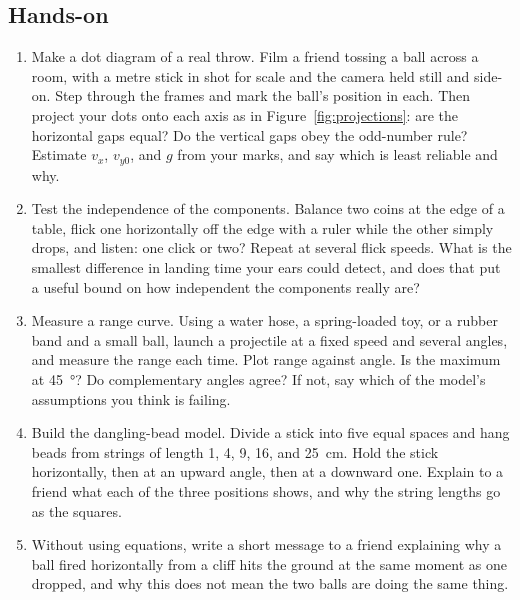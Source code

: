 \documentclass[11pt,twoside,openany]{book}
\begin{document}
\subsection*{Hands-on}
\begin{enumerate}[label=\textbf{\thechapter.\arabic*},resume=exercises,leftmargin=*]
  \item Make a dot diagram of a real throw. Film a friend tossing a ball across a room, with a metre stick in shot for scale and the camera held still and side-on. Step through the frames and mark the ball's position in each. Then project your dots onto each axis as in Figure~\ref{fig:projections}: are the horizontal gaps equal? Do the vertical gaps obey the odd-number rule? Estimate $v_x$, $v_{y0}$, and $g$ from your marks, and say which is least reliable and why.
  \item Test the independence of the components. Balance two coins at the edge of a table, flick one horizontally off the edge with a ruler while the other simply drops, and listen: one click or two? Repeat at several flick speeds. What is the smallest difference in landing time your ears could detect, and does that put a useful bound on how independent the components really are?
  \item Measure a range curve. Using a water hose, a spring-loaded toy, or a rubber band and a small ball, launch a projectile at a fixed speed and several angles, and measure the range each time. Plot range against angle. Is the maximum at \SI{45}{\degree}? Do complementary angles agree? If not, say which of the model's assumptions you think is failing.
  \item Build the dangling-bead model. Divide a stick into five equal spaces and hang beads from strings of length \SI{1}{}, \SI{4}{}, \SI{9}{}, \SI{16}{}, and \SI{25}{\centi\metre}. Hold the stick horizontally, then at an upward angle, then at a downward one. Explain to a friend what each of the three positions shows, and why the string lengths go as the squares.
  \item Without using equations, write a short message to a friend explaining why a ball fired horizontally from a cliff hits the ground at the same moment as one dropped, and why this does not mean the two balls are doing the same thing.
\end{enumerate}
\end{document}
